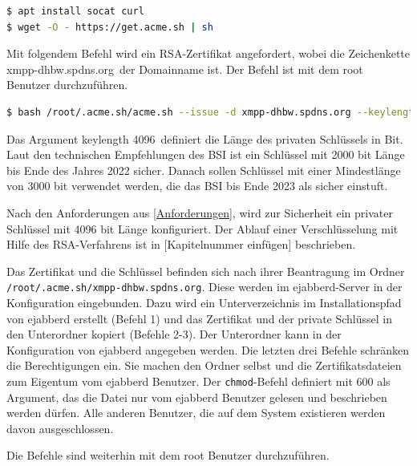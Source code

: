 \documentclass[a4paper,titlepage,halfparskip,12pt]{scrreprt}
\begin{document}
\begin{onehalfspacing}
\begin{lstlisting}[language=bash, caption={Installation der ACME-Client-Software für die Domainvalidierung}]
$ apt install socat curl
$ wget -O - https://get.acme.sh | sh
\end{lstlisting}

Mit folgendem Befehl wird ein \ac{RSA}-Zertifikat angefordert, wobei die Zeichenkette \glqq xmpp-dhbw.spdns.org\grqq\ der Domainname ist. Der Befehl ist mit dem root Benutzer durchzuführen.

\bigskip

\begin{lstlisting}[language=bash, caption={Installation des Let's Encrpt Zertifikats durch den ACME-Client}]
$ bash /root/.acme.sh/acme.sh --issue -d xmpp-dhbw.spdns.org --keylength 4096 --standalone
\end{lstlisting}

Das Argument \glqq keylength 4096\grqq\ definiert die Länge des privaten Schlüssels in Bit. Laut den technischen Empfehlungen des \ac{BSI} ist ein Schlüssel mit 2000 bit Länge bis Ende des Jahres 2022 sicher. Danach sollen Schlüssel mit einer Mindestlänge von 3000 bit verwendet werden, die das \ac{BSI} bis Ende 2023 als sicher einstuft.\cite{empfehlungBSI}

Nach den Anforderungen aus \autoref{Anforderungen}, wird zur Sicherheit ein privater Schlüssel mit 4096 bit Länge konfiguriert. Der Ablauf einer Verschlüsselung mit Hilfe des \ac{RSA}-Verfahrens ist in [Kapitelnummer einfügen] beschrieben.

Das Zertifikat und die Schlüssel befinden sich nach ihrer Beantragung im Ordner \texttt{/root/.acme.sh/xmpp-dhbw.spdns.org}. Diese werden im ejabberd-Server in der Konfiguration eingebunden. Dazu wird ein Unterverzeichnis im Installationspfad von ejabberd erstellt (Befehl 1) und das Zertifikat und der private Schlüssel in den Unterordner kopiert (Befehle 2-3). Der Unterordner kann in der Konfiguration von ejabberd angegeben werden.
Die letzten drei Befehle schränken die Berechtigungen ein. Sie machen den Ordner selbst und die Zertifikatsdateien zum Eigentum vom ejabberd Benutzer. Der \texttt{chmod}-Befehl definiert mit 600 als Argument, das die Datei nur vom ejabberd Benutzer gelesen und beschrieben werden dürfen. Alle anderen Benutzer, die auf dem System existieren werden davon ausgeschlossen.

Die Befehle sind weiterhin mit dem root Benutzer durchzuführen.

\bigskip


\end{onehalfspacing}
\end{document}

